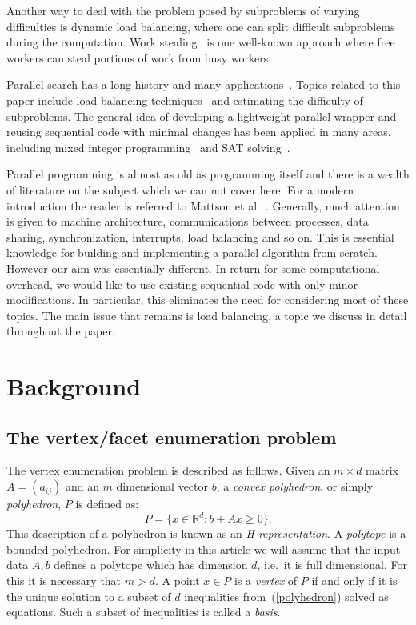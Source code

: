 \documentclass[a4paper,11pt]{article}   \usepackage{authblk} \usepackage[top=1.9cm,bottom=1.9cm,left=1.9cm,right=1.9cm]{geometry}
\newcommand{\RR}{\mathbb{R}}
\begin{document}
Another way to deal with the problem posed by subproblems 
of varying difficulties is dynamic load balancing, where one
can split difficult subproblems during the computation.  Work
stealing~\cite{BL99} is one well-known approach where free workers
can steal portions of work from busy workers.

Parallel search has a long history and many applications~\cite{GK99}.
Topics related to this paper include load balancing techniques~\cite{KGR94,KR87} and estimating the difficulty of
subproblems.  The general idea of developing a lightweight parallel wrapper and
reusing sequential code with minimal changes has been applied in many areas,
including mixed integer programming~\cite{SABHK12} and SAT solving~\cite{BSS15}.

Parallel programming is almost as old as programming itself and there is a wealth of literature
on the subject which we can not cover here. For a modern introduction the reader is referred to Mattson et al.~\cite{MSM}.
Generally, much attention is given to machine architecture, communications between processes,
data sharing, synchronization, interrupts, load balancing and so on. This is essential knowledge for building and
implementing a parallel algorithm from scratch. However our aim was essentially different.
In return for some computational overhead, we would like to use existing sequential code with only
minor modifications. In particular, this eliminates the need for considering most of these topics.
The main issue that remains is load balancing, a topic we discuss in detail throughout the paper.

\section{Background}
\label{sect:back}
\subsection{The vertex/facet enumeration problem}
\label{sect:ve}
The vertex enumeration problem is described as follows.
Given an $m \times d$ matrix $A=(a_{ij})$ and an $m$ dimensional vector
$b$, a
\emph{convex polyhedron}, or simply \emph{polyhedron}, $P$ is defined as:
\begin{equation}
\label{polyhedron}
P=\{x\in \RR^d:b+Ax\geq 0\}.
\end{equation}
This description of a polyhedron is known as an \emph{H-representation}.
A \emph{polytope} is a bounded polyhedron. For simplicity in this article
we will assume that the input data $A,b$ defines 
a polytope which has dimension $d$, i.e.\ it is
full dimensional.
For this it is necessary that $m>d$. 
A point $x\in P$ is a \emph{vertex} of $P$ if and only if
it is the unique solution to a subset of $d$ inequalities from~(\ref{polyhedron})
solved as equations. Such a subset of inequalities is called a {\em basis}.
\end{document}

